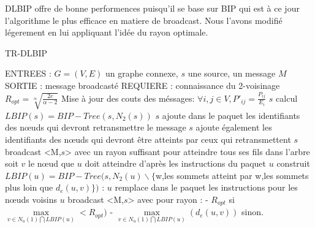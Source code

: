 DLBIP offre de bonne performences puisqu'il se base sur BIP qui est à ce jour l'algorithme le plus efficace en matiere de broadcast.
Nous l'avons modifié légerement en lui appliquant l'idée du rayon optimale.

\begin{algorithm}[H]
\caption{TR-DLBIP}
\label{algo_TRDLBIP}
\begin{algorithmic}
\STATE ENTREES : $G=(V,E)$ un graphe connexe, $s$ une source, un message $M$
\STATE SORTIE : message broadcasté
\STATE REQUIERE : connaissance du 2-voisinage
\STATE $R_{opt}=\sqrt[\alpha]{\frac{2c}{\alpha-2}}$
\STATE Mise à jour des couts des méssages: $ \forall i,j \in V, P'_{ij}=\frac{P_{ij}}{E_i}$
\STATE $s$ calcul $LBIP(s)=BIP-Tree(s,N_2(s))$
\STATE $s$ ajoute dans le paquet les identifiants des nœuds qui devront retransmettre le message
\STATE $s$ ajoute également les identifiants des nœuds qui devront être atteints par ceux qui retransmettent
\STATE $s$ broadcast <M,$s$> avec un rayon suffisant pour atteindre tous ses fils dans l'arbre
		\STATE soit $v$ le nœud que $u$ doit atteindre d'après les instructions du paquet
		\STATE $u$ construit $LBIP(u)=BIP-Tree(s,N_2(u)\backslash \{$w,les sommets atteint par w,les sommets plus loin que $d_e(u,v)\})$ :
			\INDSTATE $u$ remplace dans le paquet les instructions pour les nœuds voisins
			\INDSTATE $u$ broadcast <M,$s$> avec pour rayon : 
			      \INDSTATE[2] - $R_{opt}$ si $\max\limits_{v\in N_u(1)\bigcap LBIP(u)}< R_{opt})$
			      \INDSTATE[2] - $\max\limits_{v\in N_u(1)\bigcap LBIP(u)}(d_e(u,v))$ sinon.
	\ENDIF
\ENDIF
\end{algorithmic}
\end{algorithm}


\subsection{}











